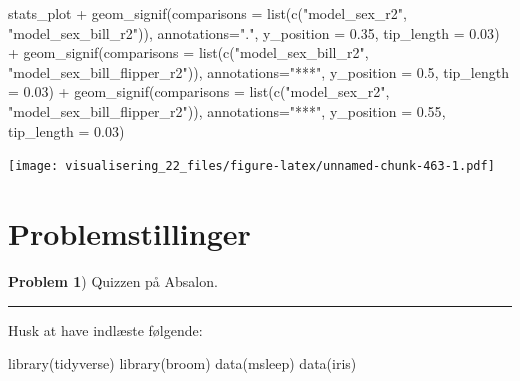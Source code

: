 \documentclass[
]{book}
\newenvironment{Shaded}{\begin{snugshade}}{\end{snugshade}}
\newcommand{\AttributeTok}[1]{\textcolor[rgb]{0.77,0.63,0.00}{#1}}
\newcommand{\FloatTok}[1]{\textcolor[rgb]{0.00,0.00,0.81}{#1}}
\newcommand{\FunctionTok}[1]{\textcolor[rgb]{0.00,0.00,0.00}{#1}}
\newcommand{\NormalTok}[1]{#1}
\newcommand{\SpecialCharTok}[1]{\textcolor[rgb]{0.00,0.00,0.00}{#1}}
\newcommand{\StringTok}[1]{\textcolor[rgb]{0.31,0.60,0.02}{#1}}
\begin{document}
\begin{Shaded}
\begin{Highlighting}[]
\NormalTok{stats\_plot }\SpecialCharTok{+}
  \FunctionTok{geom\_signif}\NormalTok{(}\AttributeTok{comparisons =} \FunctionTok{list}\NormalTok{(}\FunctionTok{c}\NormalTok{(}\StringTok{"model\_sex\_r2"}\NormalTok{, }\StringTok{"model\_sex\_bill\_r2"}\NormalTok{)), }
              \AttributeTok{annotations=}\StringTok{"."}\NormalTok{, }\AttributeTok{y\_position =} \FloatTok{0.35}\NormalTok{, }\AttributeTok{tip\_length =} \FloatTok{0.03}\NormalTok{) }\SpecialCharTok{+}
  \FunctionTok{geom\_signif}\NormalTok{(}\AttributeTok{comparisons =} \FunctionTok{list}\NormalTok{(}\FunctionTok{c}\NormalTok{(}\StringTok{"model\_sex\_bill\_r2"}\NormalTok{, }\StringTok{"model\_sex\_bill\_flipper\_r2"}\NormalTok{)), }
              \AttributeTok{annotations=}\StringTok{"***"}\NormalTok{, }\AttributeTok{y\_position =} \FloatTok{0.5}\NormalTok{, }\AttributeTok{tip\_length =} \FloatTok{0.03}\NormalTok{) }\SpecialCharTok{+}
  \FunctionTok{geom\_signif}\NormalTok{(}\AttributeTok{comparisons =} \FunctionTok{list}\NormalTok{(}\FunctionTok{c}\NormalTok{(}\StringTok{"model\_sex\_r2"}\NormalTok{, }\StringTok{"model\_sex\_bill\_flipper\_r2"}\NormalTok{)), }
              \AttributeTok{annotations=}\StringTok{"***"}\NormalTok{, }\AttributeTok{y\_position =} \FloatTok{0.55}\NormalTok{, }\AttributeTok{tip\_length =} \FloatTok{0.03}\NormalTok{)}
\end{Highlighting}
\end{Shaded}

\texttt{[image: visualisering\_22\_files/figure-latex/unnamed-chunk-463-1.pdf]}

\hypertarget{problemstillinger-7}{%
\section{Problemstillinger}\label{problemstillinger-7}}

\textbf{Problem 1}) Quizzen på Absalon.

\begin{center}\rule{0.5\linewidth}{0.5pt}\end{center}

Husk at have indlæste følgende:

\begin{Shaded}
\begin{Highlighting}[]
\FunctionTok{library}\NormalTok{(tidyverse)}
\FunctionTok{library}\NormalTok{(broom)}
\FunctionTok{data}\NormalTok{(msleep)}
\FunctionTok{data}\NormalTok{(iris)}
\end{Highlighting}
\end{Shaded}
\end{document}
